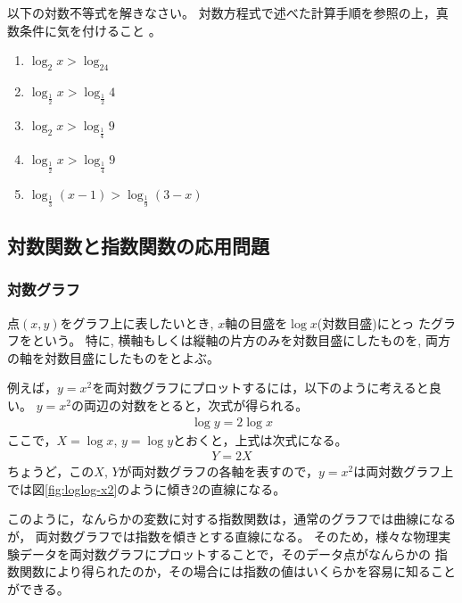 \documentclass[twocolumn,11pt]{jarticle}
\begin{document}
\exercise
以下の対数不等式を解きなさい。
対数方程式で述べた計算手順を参照の上，真数条件に気を付けること
。
\begin{enumerate}
\item $\log_2x>\log_24$
\item $\log_\frac{1}{2}x>\log_\frac{1}{2}4$
\item $\log_2x>\log_\frac{1}{4}9$
\item $\log_\frac{1}{2}x>\log_\frac{1}{4}9$
\item $\log_\frac{1}{3}(x-1)>\log_\frac{1}{9}(3-x)$
\end{enumerate}

\subsection{対数関数と指数関数の応用問題}

\subsubsection{対数グラフ}
点$(x,y)$をグラフ上に表したいとき, $x$軸の目盛を$\log x$(対数目盛)にとっ
たグラフをという。
特に, 横軸もしくは縦軸の片方のみを対数目盛にしたものを, 
両方の軸を対数目盛にしたものをとよぶ。

例えば，$y=x^2$を両対数グラフにプロットするには，以下のように考えると良い。
$y=x^2$の両辺の対数をとると，次式が得られる。
\begin{align*}
\log y=2\log x
\end{align*}
ここで，$X=\log x$, $y=\log y$とおくと，上式は次式になる。
\begin{align*}
Y=2X
\end{align*}
ちょうど，この$X$, $Y$が両対数グラフの各軸を表すので，$y=x^2$は両対数グラフ上
では図\ref{fig:loglog-x2}のように傾き2の直線になる。

このように，なんらかの変数に対する指数関数は，通常のグラフでは曲線になるが，
両対数グラフでは指数を傾きとする直線になる。
そのため，様々な物理実験データを両対数グラフにプロットすることで，そのデータ点がなんらかの
指数関数により得られたのか，その場合には指数の値はいくらかを容易に知ることができる。
\end{document}
